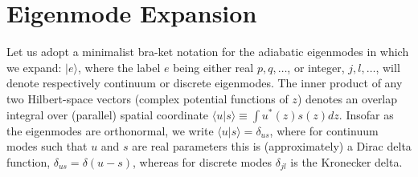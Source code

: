 \documentclass{jpp}
\def\ket#1{|#1\rangle}
\def\bra#1{\langle#1}
\begin{document}
\section{Eigenmode Expansion}
Let us adopt a minimalist bra-ket notation for the adiabatic
eigenmodes in which we expand: $\ket{e}$, where the label $e$ being
either real $p,q,\dots$, or integer, $j,l,\dots$, will denote
respectively continuum or discrete eigenmodes. The inner product of
any two Hilbert-space vectors (complex potential functions of $z$)
denotes an overlap integral over (parallel) spatial coordinate
$\bra{u}\ket{s}\equiv \int u^*(z)s(z)dz$. Insofar as the eigenmodes
are orthonormal, we write $\bra{u}\ket{s}=\delta_{us}$, where for
continuum modes such that $u$ and $s$ are real parameters this is
(approximately) a Dirac delta function, $\delta_{us}=\delta(u-s)$,
whereas for discrete modes $\delta_{jl}$ is the Kronecker delta.
\end{document}
